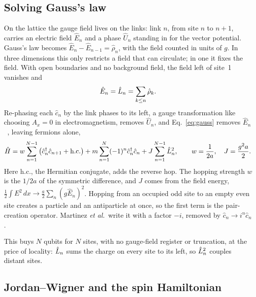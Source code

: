 \subsection{Solving Gauss's law}

On the lattice the gauge field lives on the links: link $n$, from site $n$ to
$n+1$, carries an electric field $\hat E_n$ and a phase $\hat U_n$ standing in
for the vector potential. Gauss's law becomes
$\hat E_n - \hat E_{n-1} = \hat\rho_n$, with the field counted in units of
$g$. In three dimensions this only restricts
a field that can circulate; in one it fixes the field. With open boundaries and
no background field, the field left of site~1 vanishes and
\begin{equation}
  \label{eq:gauss}
  \hat E_n = \hat{L}_{n} = \sum_{k \le n} \hat\rho_k .
\end{equation}
Re-phasing each $\hat c_n$ by the link phases to its left, a gauge
transformation like choosing $A_x = 0$ in electromagnetism, removes
$\hat U_n$, and
Eq.~\eqref{eq:gauss} removes $\hat E_n$~\cite{hamer1997,martinez2016}, leaving
fermions alone,
\begin{equation}
  \label{eq:H_fermion}
  \hat{H} = w\sum_{n=1}^{N-1}\left(\hat c^\dagger_n \hat c_{n+1} + \mathrm{h.c.}\right)
       + m\sum_{n=1}^{N}(-1)^n \hat c^\dagger_n \hat c_n
       + J\sum_{n=1}^{N-1}\hat{L}_{n}^2,
  \qquad w = \frac{1}{2a},\quad J = \frac{g^2 a}{2}.
\end{equation}
Here h.c., the Hermitian conjugate, adds the reverse hop. The hopping strength
$w$ is the $1/2a$ of the symmetric difference, and $J$ comes from the field
energy, $\tfrac12\int E^2\,dx \to \tfrac{a}{2}\sum_n (g\hat E_n)^2$. Hopping
from an occupied odd site to an empty even site creates a particle and an
antiparticle at once, so the first term is the pair-creation operator. Martinez
\emph{et al.}\ write it with a factor $-i$, removed by
$\hat c_n \to i^n \hat c_n$.

This buys $N$ qubits for $N$ sites, with no gauge-field register or
truncation, at the price of locality: $\hat{L}_{n}$ sums the charge on every site
to its left, so $\hat{L}_{n}^2$ couples distant sites.

\subsection{Jordan--Wigner and the spin Hamiltonian}


